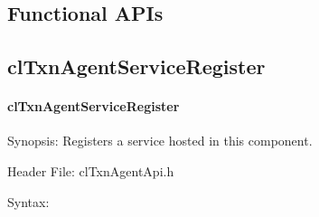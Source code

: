 \begin{flushleft}
\section{Functional APIs}
\subsection{clTxnAgentServiceRegister}
\hypertarget{pagetxn203}{}\paragraph{cl\-Txn\-Agent\-Service\-Register}\label{pagetxn203}
\begin{Desc}
\item[Synopsis:]Registers a service hosted in this component.\end{Desc}
\begin{Desc}
\item[Header File:]clTxnAgentApi.h\end{Desc}
\begin{Desc}
\item[Syntax:]


\end{Desc}
\end{flushleft}
